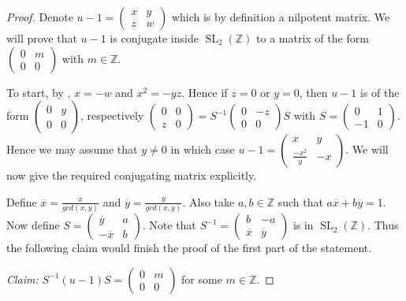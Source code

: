 \documentclass[a4paper,10pt]{amsart}
\theoremstyle{definition}
\theoremstyle{remark}
\newcommand{\SL}{\operatorname{SL}}
\newcommand\ov{\overline}
\newcommand{\Z}{{\mathbb Z}}
\begin{document}
\begin{proof}
Denote $u-1 = \begin{pmatrix}
x & y \\ z & w
\end{pmatrix}$ which is by definition a nilpotent matrix.  We will prove that $u-1$ is conjugate inside $\SL_2(\Z)$ to a matrix of the form $\begin{pmatrix}
0 & m \\ 0 & 0
\end{pmatrix}$ with $m \in \Z$.

To start, by , $x = -w$ and $x^2 = -yz$. Hence if $z=0$ or $y=0$, then $u-1$ is of the form $\begin{pmatrix}
0 & y \\ 0 & 0
\end{pmatrix}$, respectively $\begin{pmatrix}
0 & 0 \\ z & 0
\end{pmatrix} = S^{-1} \begin{pmatrix}
0 & -z \\ 0 & 0
\end{pmatrix}S$ with $S = \begin{pmatrix}
0 & 1 \\ -1 & 0
\end{pmatrix}.$ Hence we may assume that $y \neq 0$ in which case $u-1 = \begin{pmatrix}
x & y \\ \frac{-x^2}{y} & -x
\end{pmatrix}.$ We will now give the required conjugating matrix explicitly.

Define $\ov{x} = \frac{x}{gcd(x,y)}$ and $\ov{y} = \frac{y}{gcd(x,y)}$. Also take $a,b \in \Z$ such that $a \ov{x} + b \ov{y}=1$. Now define 
$S = \begin{pmatrix}
\ov{y} & a \\ - \ov{x} & b
\end{pmatrix}.$
Note that $S^{-1} = \begin{pmatrix}
b & -a \\ \ov{x} & \ov{y}
\end{pmatrix}$ is in $\SL_2(\Z)$. Thus the following claim would finish the proof of the first part of the statement.

{\it Claim:} $S^{-1} (u-1) S =  \begin{pmatrix}
0 & m \\ 0 & 0
\end{pmatrix}$ for some $m \in \Z$.


\end{proof}
\end{document}
